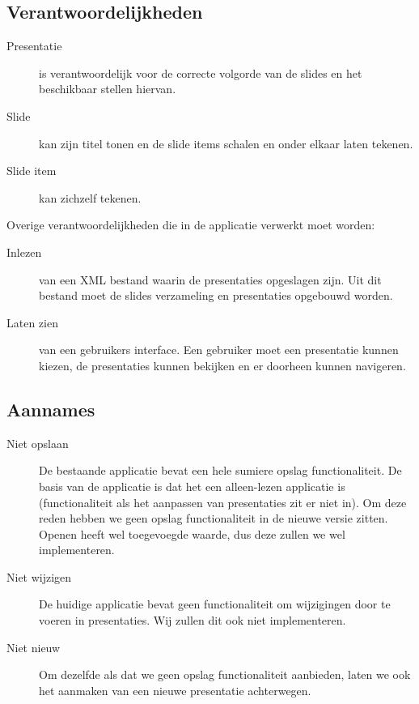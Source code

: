 \documentclass[a4paper]{article}
\begin{document}
\subsection{Verantwoordelijkheden}
\begin{description}
\item[Presentatie] is verantwoordelijk voor de correcte volgorde van de slides en het beschikbaar stellen hiervan. 
\item[Slide] kan zijn titel tonen en de slide items schalen en onder elkaar laten tekenen.
\item[Slide item] kan zichzelf tekenen.
\end{description}
Overige verantwoordelijkheden die in de applicatie verwerkt moet worden:
\begin{description}
\item[Inlezen] van een XML bestand waarin de presentaties opgeslagen zijn. Uit dit bestand moet de slides verzameling en presentaties opgebouwd worden.
\item[Laten zien] van een gebruikers interface. Een gebruiker moet een presentatie kunnen kiezen, de presentaties kunnen bekijken en er doorheen kunnen navigeren.
\end{description}

\subsection{Aannames}
\begin{description}
\item[Niet opslaan] De bestaande applicatie bevat een hele sumiere opslag functionaliteit. De basis van de applicatie is dat het een alleen-lezen applicatie is (functionaliteit als het aanpassen van presentaties zit er niet in). Om deze reden hebben we geen opslag functionaliteit in de nieuwe versie zitten. Openen heeft wel toegevoegde waarde, dus deze zullen we wel implementeren.
\item[Niet wijzigen] De huidige applicatie bevat geen functionaliteit om wijzigingen door te voeren in presentaties. Wij zullen dit ook niet implementeren.
\item[Niet nieuw] Om dezelfde als dat we geen opslag functionaliteit aanbieden, laten we ook het aanmaken van een nieuwe presentatie achterwegen.
\end{description}
\end{document}
